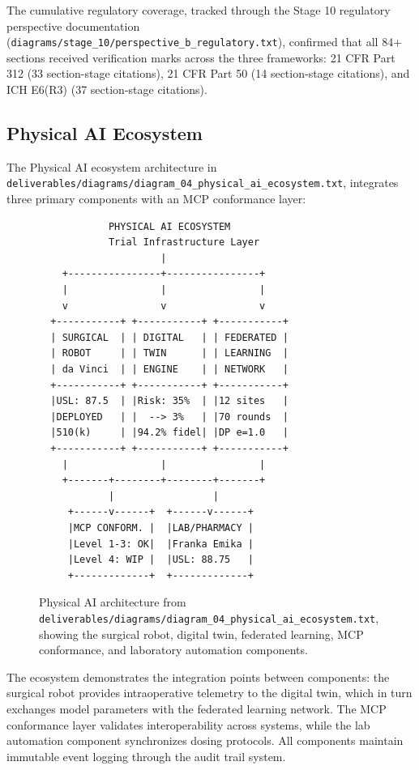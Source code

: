 \documentclass{article}
\begin{document}
The cumulative regulatory coverage, tracked through the Stage 10 regulatory perspective documentation (\texttt{diagrams/stage\_10/perspective\_b\_regulatory.txt}), confirmed that all 84+ sections received verification marks across the three frameworks: 21 CFR Part 312 (33 section-stage citations), 21 CFR Part 50 (14 section-stage citations), and ICH E6(R3) (37 section-stage citations).

\newpage

\subsection{Physical AI Ecosystem}

The Physical AI ecosystem architecture in \texttt{deliverables/diagrams/diagram\_04\_physical\_ai\_ecosystem.txt}, integrates three primary components with an MCP conformance layer:



\begin{figure}[H]
\begin{verbatim}
            PHYSICAL AI ECOSYSTEM
            Trial Infrastructure Layer
                     |
    +----------------+----------------+
    |                |                |
    v                v                v
  +-----------+ +-----------+ +-----------+
  | SURGICAL  | | DIGITAL   | | FEDERATED |
  | ROBOT     | | TWIN      | | LEARNING  |
  | da Vinci  | | ENGINE    | | NETWORK   |
  +-----------+ +-----------+ +-----------+
  |USL: 87.5  | |Risk: 35%  | |12 sites   |
  |DEPLOYED   | |  --> 3%   | |70 rounds  |
  |510(k)     | |94.2% fidel| |DP e=1.0   |
  +-----------+ +-----------+ +-----------+
    |                |                |
    +-------+--------+--------+-------+
            |                 |
     +------v------+  +------v------+
     |MCP CONFORM. |  |LAB/PHARMACY |
     |Level 1-3: OK|  |Franka Emika |
     |Level 4: WIP |  |USL: 88.75   |
     +-------------+  +-------------+
\end{verbatim}
\caption{Physical AI architecture from \texttt{deliverables/diagrams/diagram\_04\_physical\_ai\_ecosystem.txt}, showing the surgical robot, digital twin, federated learning, MCP conformance, and laboratory automation components.}
\label{fig:pai-ecosystem}
\end{figure}

The ecosystem demonstrates the integration points between components: the surgical robot provides intraoperative telemetry to the digital twin, which in turn exchanges model parameters with the federated learning network. The MCP conformance layer validates interoperability across systems, while the lab automation component synchronizes dosing protocols. All components maintain immutable event logging through the audit trail system.
\end{document}
